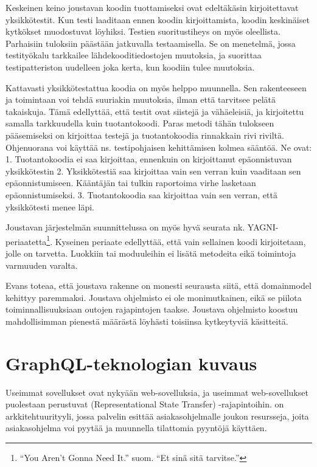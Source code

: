 Keskeinen keino joustavan koodin tuottamiseksi ovat edeltäkäsin
kirjoitettavat yksikkötestit. Kun testi laaditaan ennen koodin
kirjoittamista, koodin keskinäiset kytkökset muodostuvat löyhiksi.
Testien suoritustiheys on myös oleellista. Parhaisiin tuloksiin päästään
jatkuvalla testaamisella. Se on menetelmä, jossa testityökalu tarkkailee
lähdekooditiedostojen muutoksia, ja suorittaa testipatteriston uudelleen
joka kerta, kun koodiin tulee muutoksia. \cite[luku 6]{beck2004extreme}

Kattavasti yksikkötestattua koodia on myös helppo muunnella. Sen
rakenteeseen ja toimintaan voi tehdä suuriakin muutoksia, ilman että
tarvitsee pelätä takaiskuja. Tämä edellyttää, että testit ovat siistejä
ja vähäeleisiä, ja kirjoitettu samalla tarkkuudella kuin tuotantokoodi.
Paras metodi tähän tulokseen pääsemiseksi on kirjoittaa testejä ja
tuotantokoodia rinnakkain rivi riviltä. Ohjenuorana voi käyttää ns.
testipohjaisen kehittämisen kolmea sääntöä. Ne ovat: 1. Tuotantokoodia
ei saa kirjoittaa, ennenkuin on kirjoittanut epäonnistuvan yksikkötestin
2. Yksikkötestiä saa kirjoittaa vain sen verran kuin vaaditaan sen
epäonnistumiseen. Kääntäjän tai tulkin raportoima virhe lasketaan
epäonnistumiseksi. 3. Tuotantokoodia saa kirjoittaa vain sen verran,
että yksikkötesti menee läpi.\cite[luku 9]{martin2008clean}

Joustavan järjestelmän suunnittelussa on myös hyvä seurata nk.
YAGNI-periaatetta\footnote{``You Aren't Gonna Need It.'' suom. ``Et sinä
  sitä tarvitse.''}. Kyseinen periaate edellyttää, että vain sellainen
koodi kirjoitetaan, jolle on tarvetta. Luokkiin tai moduuleihin ei
lisätä metodeita eikä toimintoja varmuuden varalta. \cite{jeffries1998}

Evans toteaa, että joustava rakenne on monesti seurausta siitä, että
\gls{domainmodel} kehittyy paremmaksi. Joustava ohjelmisto ei ole
monimutkainen, eikä se piilota toiminnallisuuksiaan outojen rajapintojen
taakse. Joustava ohjelmisto koostuu mahdollisimman pienestä määrästä
löyhästi toisiinsa kytkeytyviä käsitteitä.\cite[luku 10]{evans:ddd}

\hypertarget{graphql-teknologian-kuvaus}{%
\section{GraphQL-teknologian kuvaus}\label{graphql-teknologian-kuvaus}}

Useimmat sovellukset ovat nykyään web-sovelluksia, ja useimmat
web-sovellukset puolestaan perustuvat 
(Representational State Transfer) -rajapintoihin.  on
arkkitehtuurityyli, jossa palvelin esittää asiakasohjelmalle joukon
resursseja, joita asiakasohjelma voi pyytää ja muunnella tilattomia
pyyntöjä käyttäen.\cite{fielding2000architectural}

